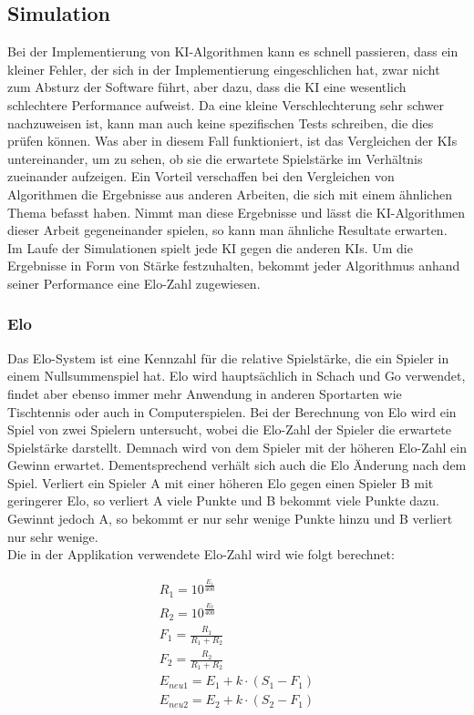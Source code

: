 \documentclass[12pt,a4paper,bibliography=totocnumbered,listof=totocnumbered]{article}
\begin{document}
\subsection{Simulation}
Bei der Implementierung von \ac{KI}-Algorithmen kann es schnell passieren, dass ein kleiner Fehler, der sich in der Implementierung eingeschlichen hat, 
zwar nicht zum Absturz der Software führt, aber dazu, dass die \ac{KI} eine wesentlich schlechtere Performance aufweist. Da eine kleine Verschlechterung 
sehr schwer nachzuweisen ist, kann man auch keine spezifischen Tests schreiben, die dies prüfen können. Was aber in diesem Fall funktioniert, 
ist das Vergleichen der \ac{KI}s untereinander, um zu sehen, ob sie die erwartete Spielstärke im Verhältnis zueinander aufzeigen.
Ein Vorteil verschaffen bei den Vergleichen von Algorithmen die Ergebnisse aus anderen Arbeiten, die sich mit einem ähnlichen Thema befasst haben.
Nimmt man diese Ergebnisse und lässt die \ac{KI}-Algorithmen dieser Arbeit gegeneinander spielen, so kann man ähnliche Resultate erwarten.
\\
Im Laufe der Simulationen spielt jede \ac{KI} gegen die anderen \ac{KI}s. Um die Ergebnisse in Form von Stärke festzuhalten, bekommt jeder Algorithmus anhand
seiner Performance eine Elo-Zahl zugewiesen.

\subsubsection{Elo}
Das Elo-System ist eine Kennzahl für die relative Spielstärke, die ein Spieler in einem Nullsummenspiel hat. Elo wird hauptsächlich in Schach und Go verwendet,
findet aber ebenso immer mehr Anwendung in anderen Sportarten wie Tischtennis oder auch in Computerspielen. Bei der Berechnung von Elo wird ein Spiel von zwei 
Spielern untersucht, wobei die Elo-Zahl der Spieler die erwartete Spielstärke darstellt. Demnach wird von dem Spieler mit der höheren Elo-Zahl ein 
Gewinn erwartet. Dementsprechend verhält sich auch die Elo Änderung nach dem Spiel. Verliert ein Spieler A mit einer höheren Elo gegen einen
Spieler B mit geringerer Elo, so verliert A viele Punkte und B bekommt viele Punkte dazu. Gewinnt jedoch A, so bekommt er nur sehr wenige Punkte hinzu und B verliert 
nur sehr wenige. 
\\ 
Die in der Applikation verwendete Elo-Zahl wird wie folgt berechnet:

\begin{align}
    R_1 = 10^{\frac{E_1}{400}} \\ 
    R_2 = 10^{\frac{E_2}{400}} \\
    F_1 = \frac{R_1}{R_1+R_2} \\ 
    F_2 = \frac{R_2}{R_1+R_2} \\
    E_{neu1} = E_1 + k \cdot (S_1 - F_1) \\ 
    E_{neu2} = E_2 + k \cdot (S_2 - F_1)  
\end{align}
\end{document}
